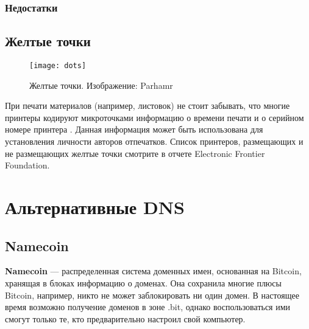\subsubsection{Недостатки}
\subsection{Желтые точки}
\begin{wrapfigure}[9]{r}{0.25\linewidth}
\texttt{[image: dots]}
\caption{Желтые точки. Изображение: Parhamr}
\end{wrapfigure}
При печати материалов (например, листовок) не стоит забывать, что многие принтеры кодируют микроточками информацию о времени печати и о серийном номере принтера \cite{eff_dots}. Данная информация может быть использована для установления личности авторов отпечатков. Список принтеров, размещающих и не размещающих желтые точки смотрите в отчете Electronic Frontier Foundation\cite{eff_list}.

\section{Альтернативные DNS}
\subsection{Namecoin}
\textbf{Namecoin} --- распределенная система доменных имен, основанная на Bitcoin, хранящая в блоках информацию о доменах. Она сохранила многие плюсы Bitcoin, например, никто не может заблокировать ни один домен. В настоящее время возможно получение доменов в зоне .bit, однако воспользоваться ими смогут только те, кто предварительно настроил свой компьютер.

